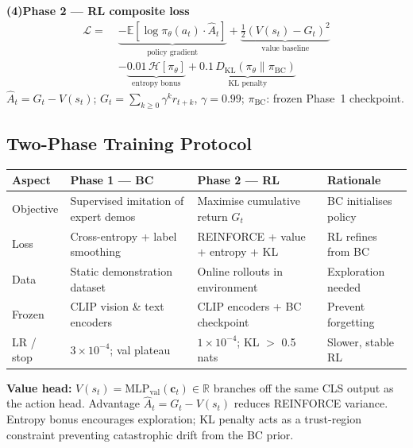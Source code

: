\documentclass[11pt, a4paper]{article}
\renewcommand{\arraystretch}{1.18}
\begin{document}
\begin{eqnbox}
\begin{minipage}[t]{0.49\linewidth}
\medskip
\textbf{(4)\;Phase 2 --- RL composite loss}
\begin{align*}
  \mathcal{L} =\;
    &\underbrace{-\mathbb{E}[\log\pi_\theta(a_t)\cdot\hat{A}_t]}_{\text{policy gradient}}
    +\underbrace{\tfrac{1}{2}(V(s_t)-G_t)^2}_{\text{value baseline}} \\[2pt]
    &-\underbrace{0.01\,\mathcal{H}[\pi_\theta]}_{\text{entropy bonus}}
    +\underbrace{0.1\,D_{\mathrm{KL}}(\pi_\theta \| \pi_{\mathrm{BC}})}_{\text{KL penalty}}
\end{align*}
$\hat{A}_t{=}G_t{-}V(s_t)$;
$G_t{=}\sum_{k\geq0}\gamma^k r_{t+k}$, $\gamma{=}0.99$;
$\pi_{\mathrm{BC}}$: frozen Phase~1 checkpoint.

\end{minipage}
\end{eqnbox}

\vspace{4pt}

\subsection*{Two-Phase Training Protocol}

\begin{center}
\small\renewcommand{\arraystretch}{1.16}
\begin{tabular}{L{2.4cm} L{4.6cm} L{4.6cm} L{3.1cm}}
\toprule
\textbf{Aspect} & \textbf{Phase 1 --- BC} & \textbf{Phase 2 --- RL} & \textbf{Rationale} \\
\midrule
Objective     & Supervised imitation of expert demos    & Maximise cumulative return $G_t$    & BC initialises policy \\
Loss          & Cross-entropy + label smoothing         & REINFORCE + value + entropy + KL    & RL refines from BC \\
Data          & Static demonstration dataset            & Online rollouts in environment      & Exploration needed \\
Frozen        & CLIP vision \& text encoders            & CLIP encoders + BC checkpoint       & Prevent forgetting \\
LR / stop     & $3{\times}10^{-4}$; val plateau         & $1{\times}10^{-4}$; KL $>$ 0.5 nats & Slower, stable RL \\
\bottomrule
\end{tabular}
\end{center}

\vspace{2pt}

\noindent\small\color{DimGray}
\textbf{Value head:}\enspace
$V(s_t)\!=\!\mathrm{MLP}_{\mathrm{val}}(\mathbf{c}_t)\!\in\!\mathbb{R}$ branches
off the same CLS output as the action head.  Advantage
$\hat{A}_t = G_t - V(s_t)$ reduces REINFORCE variance.
Entropy bonus encourages exploration; KL penalty acts as a trust-region
constraint preventing catastrophic drift from the BC prior.
\normalcolor\normalsize
\end{document}
